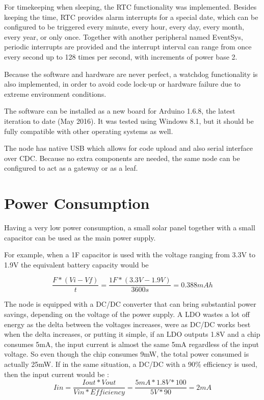 For timekeeping when sleeping, the RTC functionality was implemented. Besides keeping the time, RTC
provides alarm interrupts for a special date, which can be configured to be triggered every
minute, every hour, every day, every month, every year, or only once. Together with another
peripheral named EventSys, periodic interrupts are provided and the interrupt interval can range
from once every second up to 128 times per second, with increments of power base 2.

Because the software and hardware are never perfect, a watchdog functionality is also implemented,
in order to avoid code lock-up or hardware failure due to extreme environment conditions.

The software can be installed as a new board for Arduino 1.6.8, the latest iteration to date (May
2016). It was tested using Windows 8.1, but it should be fully compatible with other operating systems as well.

The node has native USB which allows for code upload and also serial interface over CDC. Because no
extra components are needed, the same node can be configured to act as a gateway or
as a leaf.

\label{chap:results}


\section{Power Consumption}

Having a very low power consumption, a small solar panel together with a
small capacitor can be used as the main power supply.

For example, when a 1F capacitor is used with the voltage ranging from 3.3V to 1.9V the equivalent battery capacity would be

$$ \frac{F * (Vi - Vf)}{t} = \frac{1F * (3.3V - 1.9V)}{3600s} = 0.388mAh$$

The node is equipped with a DC/DC converter that can bring substantial power savings, depending on
the voltage of the power supply. A LDO wastes a lot off energy as the delta between the
voltages increases, were as DC/DC works best when the delta increases, or putting it simple, if an
LDO outputs 1.8V and a chip consumes 5mA, the input current is almost the same 5mA regardless of the
input voltage. So even though the chip consumes 9mW, the total power consumed is actually 25mW. If
in the same situation, a DC/DC with a 90\% efficiency is used, then the input current would be :
$$Iin = \frac{Iout * Vout}{Vin*Efficiency} = \frac{5mA * 1.8V*100}{5V*90}= 2mA$$


